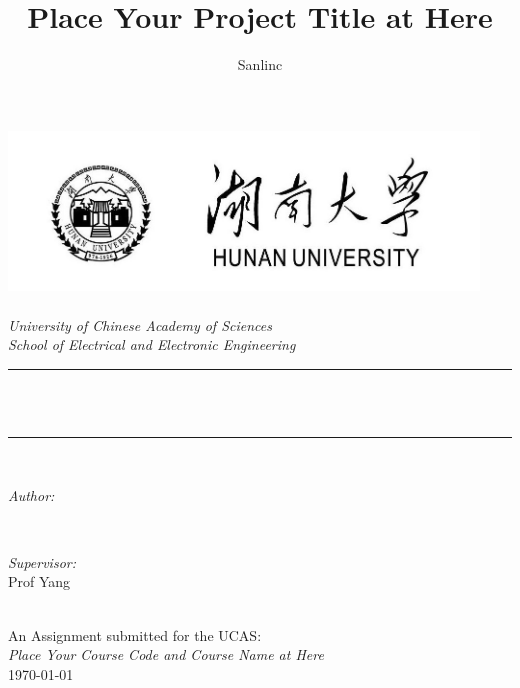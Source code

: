\documentclass[12pt]{article}
\title{Place Your Project Title at Here}
\author{\textup{Sanlinc}}
\begin{document}
    \renewcommand\theequation{\thesubsection.\arabic{equation}}
    \newtheorem{mythm}{定理}[section]  %

\begin{titlepage}
	\newcommand{\HRule}{\rule{\linewidth}{0.5mm}}
	\includegraphics[width=12.5cm]{sc_logo.jpg}\\[1cm] 
	\center 
	\quad\\[1.5cm]
	\textsl{\Large University of Chinese Academy of Sciences }\\[0.5cm] 
	\textsl{\large School of Electrical and Electronic Engineering}\\[0.5cm] 
	\makeatletter
	\HRule \\[0.4cm]
	{ \huge \bfseries \@title}\\[0.4cm] 
	\HRule \\[1.5cm]
	\begin{minipage}{0.4\textwidth}
		\begin{flushleft} \large
			\emph{Author:}\\
			\@author 
		\end{flushleft}
	\end{minipage}
	~
	\begin{minipage}{0.4\textwidth}
		\begin{flushright} \large
			\emph{Supervisor:} \\
			\textup{Prof Yang}
		\end{flushright}
	\end{minipage}\\[3cm]
	\makeatother
	{\large An Assignment submitted for the UCAS:}\\[0.5cm]
	{\large \emph{Place Your Course Code and Course Name at Here}}\\[0.5cm]
	{\large \today}\\[2cm] 
	\vfill 
\end{titlepage}

\thispagestyle{empty}
\clearpage     %
\tableofcontents        %
\pagestyle{headings}
\end{document}
